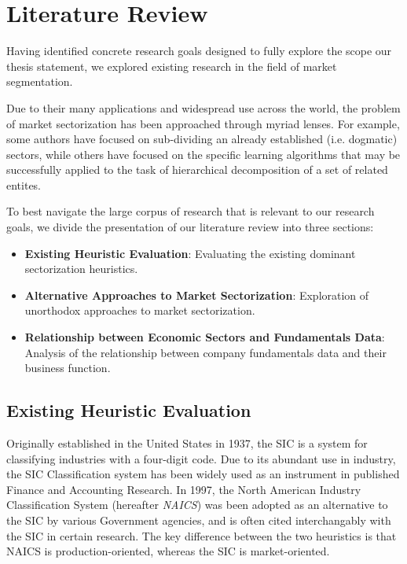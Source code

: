 \documentclass[../main.tex]{subfiles}
\begin{document}
    
\chapter{Literature Review}

Having identified concrete research goals designed to fully explore the scope our thesis statement, we explored existing research in the field of market segmentation.

Due to their many applications and widespread use across the world, the problem of market sectorization has been approached through myriad lenses. For example, some authors have focused on sub-dividing an already established (i.e. dogmatic) sectors, while others have focused on the specific learning algorithms that may be successfully applied to the task of hierarchical decomposition of a set of related entites.

To best navigate the large corpus of research that is relevant to our research goals, we divide the presentation of our literature review into three sections:

\begin{itemize}
    \item \textbf{Existing Heuristic Evaluation}: Evaluating the existing dominant sectorization heuristics.
    \item \textbf{Alternative Approaches to Market Sectorization}: Exploration of unorthodox approaches to market sectorization.
    \item \textbf{Relationship between Economic Sectors and Fundamentals Data}: Analysis of the relationship between company fundamentals data and their business function.
\end{itemize}


\section{Existing Heuristic Evaluation} \label{literature_review:existing_heuristic_evaluation}

Originally established in the United States in 1937, the SIC is a system for classifying industries with a four-digit code. Due to its abundant use in industry, the SIC Classification system has been widely used as an instrument in published Finance and Accounting Research. In 1997, the North American Industry Classification System (hereafter \textit{NAICS}) was been adopted as an alternative to the SIC by various Government agencies, and is often cited interchangably with the SIC in certain research. The key difference between the two heuristics is that NAICS is production-oriented, whereas the SIC is market-oriented.
\end{document}
